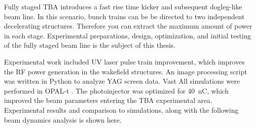 Fully staged TBA introduces a fast rise time kicker
and subsequent dogleg-like beam line. In this scenario, bunch trains can be 
be directed to two independent decelerating structures. 
Therefore you can extract the maximum amount of power in each stage.
Experimental preparations, design, optimization, 
and initial testing of the fully staged beam line
is the subject of this thesis. 


Experimental work included UV laser pulse train improvement, 
which improves the RF power generation in the wakefield structures.
An image processing script was written in Python to analyze YAG screen data. 
Vast
All simulations were performed in OPAL-t \cite{opal}.
The photoinjector was optimized for \SI{40}{nC}, 
which improved the beam parameters entering the TBA experimental area.
Experimental results and comparison to simulations, along 
with the following beam dynamics analysis is shown here.

 \label{sec:facility}

